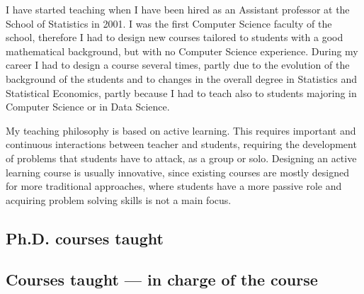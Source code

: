 \documentclass[11pt,a4paper,roman]{moderncv}
\begin{document}
I have started teaching when I have been hired as an Assistant professor at
the School of Statistics in 2001.
I was the first Computer Science faculty of the school, therefore I had to
design new courses tailored to students with a good mathematical background,
but with no Computer Science experience.
During my career I had to design a course several times, partly due to the
evolution of the background of the students and to changes in the overall
degree in Statistics and Statistical Economics, partly because I had to teach
also to students majoring in Computer Science or in Data Science.

My teaching philosophy is based on active learning. This requires important
and continuous interactions between teacher and students, requiring the
development of problems that students have to attack, as a group or solo.
Designing an active learning course is usually innovative, since existing
courses are mostly designed for more traditional approaches, where students
have a more passive role and acquiring problem solving skills is not a main focus.

\subsection{Ph.D. courses taught}




\subsection{Courses taught --- in charge of the course}


\end{document}
